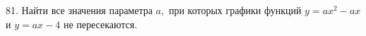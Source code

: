81. Найти все значения параметра $a,$ при которых графики функций $y=ax^2-ax$ и $y=ax-4$ не пересекаются.\\
